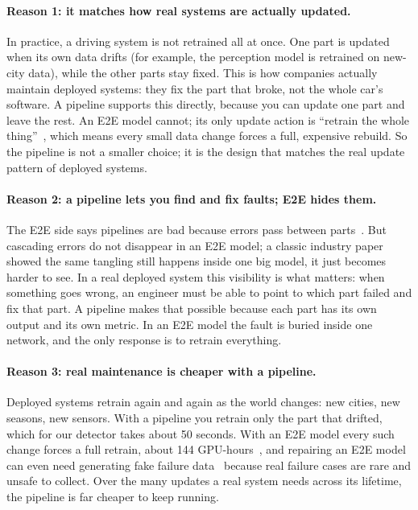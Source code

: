 \documentclass[11pt,a4paper]{article}
\begin{document}
\paragraph{Reason 1: it matches how real systems are actually updated.}
In practice, a driving system is not retrained all at once. One part is
updated when its own data drifts (for example, the perception model is
retrained on new-city data), while the other parts stay fixed. This is
how companies actually maintain deployed systems: they fix the part that
broke, not the whole car's software. A pipeline supports this directly,
because you can update one part and leave the rest. An E2E model cannot;
its only update action is ``retrain the whole
thing''~\cite{ma2025correctad}, which means every small data change forces
a full, expensive rebuild. So the pipeline is not a smaller choice; it is
the design that matches the real update pattern of deployed systems.

\paragraph{Reason 2: a pipeline lets you find and fix faults; E2E hides them.}
The E2E side says pipelines are bad because errors pass between
parts~\cite{sun2024sparsedrive,chen2024e2esurvey}. But cascading errors do
not disappear in an E2E model; a classic industry
paper~\cite{sculley2015hidden} showed the same tangling still happens
inside one big model, it just becomes harder to see. In a real deployed
system this visibility is what matters: when something goes wrong, an
engineer must be able to point to which part failed and fix that part. A
pipeline makes that possible because each part has its own output and its
own metric. In an E2E model the fault is buried inside one network, and
the only response is to retrain everything.

\paragraph{Reason 3: real maintenance is cheaper with a pipeline.}
Deployed systems retrain again and again as the world changes: new
cities, new seasons, new sensors. With a pipeline you retrain only the
part that drifted, which for our detector takes about 50 seconds. With an
E2E model every such change forces a full retrain, about 144
GPU-hours~\cite{sun2024sparsedrive}, and repairing an E2E model can even
need generating fake failure data~\cite{ma2025correctad} because real
failure cases are rare and unsafe to collect. Over the many updates a real
system needs across its lifetime, the pipeline is far cheaper to keep
running.
\end{document}
